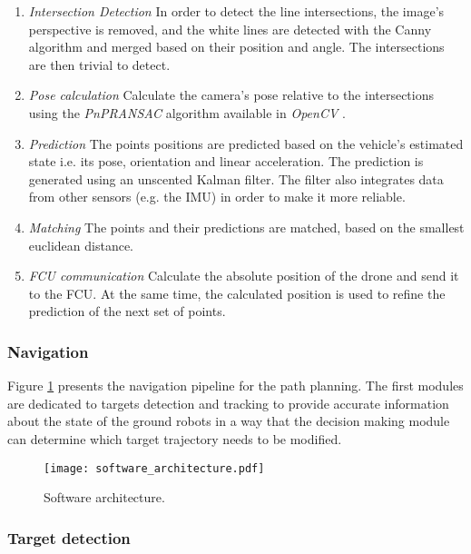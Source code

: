 \vspace{-0.5cm}
\begin{enumerate} \itemsep -4pt
	\item \textit{Intersection Detection} In order to detect the line intersections, the image’s perspective is removed, and the white lines are detected with the Canny algorithm \cite{canny1986computational} and merged based on their position and angle. The intersections are then trivial to detect.
	\item \textit{Pose calculation} Calculate the camera’s pose relative to the intersections using the \textit{PnPRANSAC} algorithm available in \textit{OpenCV} \cite{lepetit2009epnp}.
	\item \textit{Prediction} The points positions are predicted based on the vehicle’s estimated state i.e. its pose, orientation and linear acceleration. The prediction is generated using an unscented Kalman filter. The filter also integrates data from other sensors (e.g. the IMU) in order to make it more reliable.
	\item \textit{Matching} The points and their predictions are matched, based on the smallest euclidean distance.
	\item \textit{FCU communication} Calculate the absolute position of the drone and send it to the FCU. At the same time, the calculated position is used to refine the prediction of the next set of points.
\end{enumerate}

\subsubsection*{Navigation}

Figure \ref{fig:gnc-software} presents the navigation pipeline for the path planning. The first modules are dedicated to targets detection and tracking to provide accurate information about the state of the ground robots in a way that the decision making module can determine which target trajectory needs to be modified. 

\begin{figure}[h]
	\texttt{[image: software\_architecture.pdf]}
	\vspace{-0.5cm}
	\caption{Software architecture.}
	\label{fig:gnc-software}
\end{figure}

\subsubsection*{Target detection}

